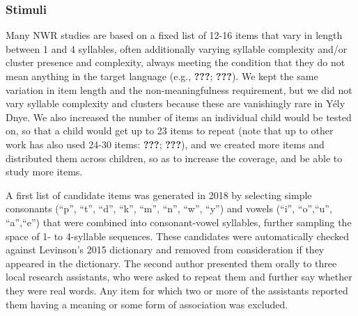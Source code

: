 \documentclass[english,,man,floatsintext]{apa6}
\begin{document}
\hypertarget{stimuli}{%
\subsubsection{Stimuli}\label{stimuli}}

Many NWR studies are based on a fixed list of 12-16 items that vary in length between 1 and 4 syllables, often additionally varying syllable complexity and/or cluster presence and complexity, always meeting the condition that they do not mean anything in the target language (e.g., {\textbf{???}}; {\textbf{???}}). We kept the same variation in item length and the non-meaningfulness requirement, but we did not vary syllable complexity and clusters because these are vanishingly rare in Yély Dnye. We also increased the number of items an individual child would be tested on, so that a child would get up to 23 items to repeat (note that up to other work has also used 24-30 items: {\textbf{???}}; {\textbf{???}}), and we created more items and distributed them across children, so as to increase the coverage, and be able to study more items.

A first list of candidate items was generated in 2018 by selecting simple consonants (\enquote{p}, \enquote{t}, \enquote{d}, \enquote{k}, \enquote{m}, \enquote{n}, \enquote{w}, \enquote{y}) and vowels (\enquote{i}, \enquote{o},\enquote{u}, \enquote{a},\enquote{e}) that were combined into consonant-vowel syllables, further sampling the space of 1- to 4-syllable sequences. These candidates were automatically checked against Levinson's 2015 dictionary and removed from consideration if they appeared in the dictionary. The second author presented them orally to three local research assistants, who were asked to repeat them and further say whether they were real words. Any item for which two or more of the assistants reported them having a meaning or some form of association was excluded.
\end{document}
